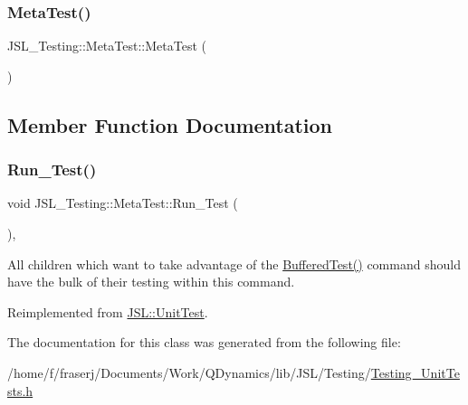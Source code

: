 \subsubsection{\texorpdfstring{Meta\+Test()}{MetaTest()}}
{\footnotesize\ttfamily J\+S\+L\+\_\+\+Testing\+::\+Meta\+Test\+::\+Meta\+Test (\begin{DoxyParamCaption}{ }\end{DoxyParamCaption})\hspace{0.3cm}{\ttfamily [inline]}}



\subsection{Member Function Documentation}
\mbox{\label{classJSL__Testing_1_1MetaTest_a176352dcd54f9ec7df8f1548882e6820}} 
\subsubsection{\texorpdfstring{Run\+\_\+\+Test()}{Run\_Test()}}
{\footnotesize\ttfamily void J\+S\+L\+\_\+\+Testing\+::\+Meta\+Test\+::\+Run\+\_\+\+Test (\begin{DoxyParamCaption}{ }\end{DoxyParamCaption})\hspace{0.3cm}{\ttfamily [inline]}, {\ttfamily [virtual]}}



All children which want to take advantage of the \hyperlink{classJSL_1_1UnitTest_aabec19b081be8a428f12e4b5e3dc2a9c}{Buffered\+Test()} command should have the bulk of their testing within this command. 



Reimplemented from \hyperlink{classJSL_1_1UnitTest_aa8369ab1ce2a537bff2ea7e1c8818490}{J\+S\+L\+::\+Unit\+Test}.



The documentation for this class was generated from the following file\+:\begin{DoxyCompactItemize}
\item 
/home/f/fraserj/\+Documents/\+Work/\+Q\+Dynamics/lib/\+J\+S\+L/\+Testing/\hyperlink{Testing__UnitTests_8h}{Testing\+\_\+\+Unit\+Tests.\+h}\end{DoxyCompactItemize}
